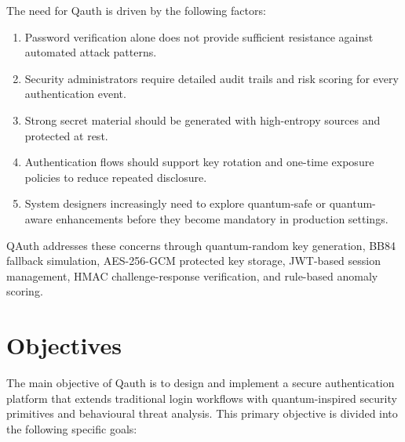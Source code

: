 \documentclass[12pt,a4paper]{report}
\begin{document}
The need for Qauth is driven by the following factors:

\begin{enumerate}
    \item Password verification alone does not provide sufficient resistance against automated attack patterns.
    \item Security administrators require detailed audit trails and risk scoring for every authentication event.
    \item Strong secret material should be generated with high-entropy sources and protected at rest.
    \item Authentication flows should support key rotation and one-time exposure policies to reduce repeated disclosure.
    \item System designers increasingly need to explore quantum-safe or quantum-aware enhancements before they become mandatory in production settings.
\end{enumerate}
QAuth addresses these concerns through quantum-random key generation, BB84 fallback simulation, AES-256-GCM protected key storage, JWT-based session management, HMAC challenge-response verification, and rule-based anomaly scoring.

\section{Objectives}
The main objective of Qauth is to design and implement a secure authentication platform that extends traditional login workflows with quantum-inspired security primitives and behavioural threat analysis. This primary objective is divided into the following specific goals:
\end{document}
